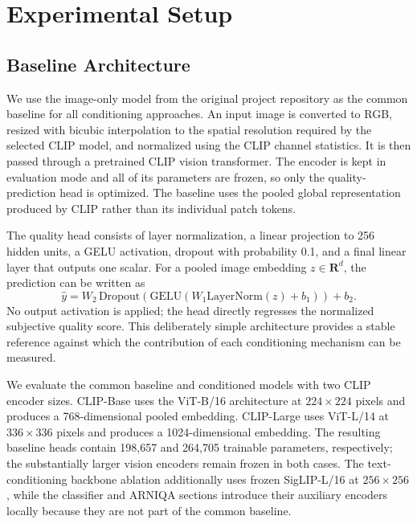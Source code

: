 \documentclass{article}
\begin{document}
\section{Experimental Setup}

\subsection{Baseline Architecture}

We use the image-only model from the original project repository as the common baseline for all conditioning approaches. An input image is converted to RGB, resized with bicubic interpolation to the spatial resolution required by the selected CLIP model, and normalized using the CLIP channel statistics. It is then passed through a pretrained CLIP vision transformer. The encoder is kept in evaluation mode and all of its parameters are frozen, so only the quality-prediction head is optimized. The baseline uses the pooled global representation produced by CLIP rather than its individual patch tokens.

The quality head consists of layer normalization, a linear projection to 256 hidden units, a GELU activation, dropout with probability 0.1, and a final linear layer that outputs one scalar. For a pooled image embedding $z \in \mathbf{R}^{d}$, the prediction can be written as
\[
\hat{y} = W_2\,\mathrm{Dropout}\!\left(\mathrm{GELU}\!\left(W_1\mathrm{LayerNorm}(z)+b_1\right)\right)+b_2.
\]
No output activation is applied; the head directly regresses the normalized subjective quality score. This deliberately simple architecture provides a stable reference against which the contribution of each conditioning mechanism can be measured.

We evaluate the common baseline and conditioned models with two CLIP encoder sizes. CLIP-Base uses the ViT-B/16 architecture at $224\times224$ pixels and produces a 768-dimensional pooled embedding. CLIP-Large uses ViT-L/14 at $336\times336$ pixels and produces a 1024-dimensional embedding. The resulting baseline heads contain 198,657 and 264,705 trainable parameters, respectively; the substantially larger vision encoders remain frozen in both cases. The text-conditioning backbone ablation additionally uses frozen SigLIP-L/16 at $256\times256$, while the classifier and ARNIQA sections introduce their auxiliary encoders locally because they are not part of the common baseline.

\begin{table}[htbp]
\centering
\small
\setlength{\tabcolsep}{5pt}
\caption{Primary backbone variants used for the common baseline. In both cases only the regression head is trainable.}
\label{tab:backbones}
\end{table}
\end{document}
